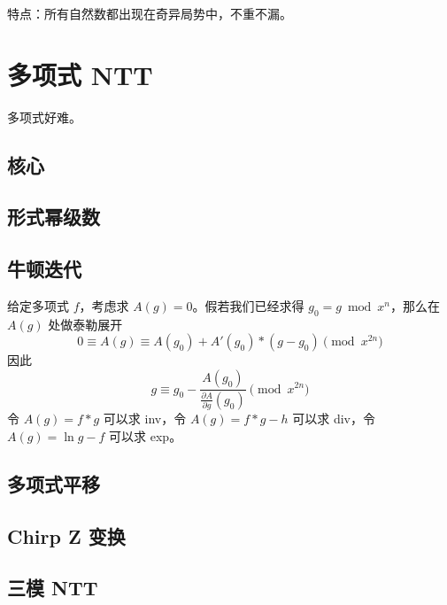 \documentclass{probook}
\begin{document}
\begin{multicols}{2}
特点：所有自然数都出现在奇异局势中，不重不漏。

\section{多项式 NTT}

多项式好难。

\subsection{核心}



\subsection{形式幂级数}



\subsection{牛顿迭代}

给定多项式 $f$，考虑求 $A(g) = 0$。假若我们已经求得 $g_0 = g \bmod x^n$，那么在 $A(g)$ 处做泰勒展开
\[ 0 \equiv A(g) \equiv A(g_0) + A'(g_0) \ast (g - g_0) \pmod{x^{2n}} \]
因此
\[ g \equiv g_0 - \frac{A(g_0)}{\frac{\partial A}{\partial g}(g_0)} \pmod{x^{2n}} \]
令 $A(g) = f \ast g$ 可以求 inv，令 $A(g) = f \ast g - h$ 可以求 div，令 $A(g) = \ln g - f$ 可以求 exp。



\subsection{多项式平移}



\subsection{Chirp Z 变换}



\subsection{三模 NTT}


\end{multicols}
\end{document}
